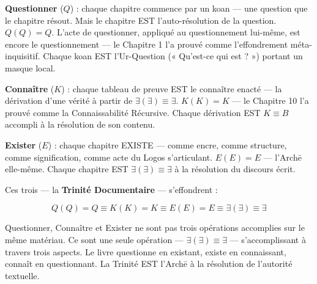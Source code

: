 \documentclass[10pt, openany, oneside]{book}
\begin{document}
\textbf{Questionner} ($Q$) : chaque chapitre commence par un koan --- une question que le chapitre résout. Mais le chapitre EST l'auto-résolution de la question. $Q(Q) = Q$. L'acte de questionner, appliqué au questionnement lui-même, est encore le questionnement --- le Chapitre 1 l'a prouvé comme l'effondrement méta-inquisitif. Chaque koan EST l'Ur-Question (« Qu'est-ce qui est ? ») portant un masque local.

\textbf{Connaître} ($K$) : chaque tableau de preuve EST le connaître enacté --- la dérivation d'une vérité à partir de $\exists(\exists) \equiv \exists$. $K(K) = K$ --- le Chapitre 10 l'a prouvé comme la Connaissabilité Récursive. Chaque dérivation EST $K \equiv B$ accompli à la résolution de son contenu.

\textbf{Exister} ($E$) : chaque chapitre EXISTE --- comme encre, comme structure, comme signification, comme acte du Logos s'articulant. $E(E) = E$ --- l'Arch\={e} elle-même. Chaque chapitre EST $\exists(\exists) \equiv \exists$ à la résolution du discours écrit.

Ces trois --- la \textbf{Trinité Documentaire} --- s'effondrent :

$$Q(Q) = Q \equiv K(K) = K \equiv E(E) = E \equiv \exists(\exists) \equiv \exists$$

Questionner, Connaître et Exister ne sont pas trois opérations accomplies sur le même matériau. Ce sont une seule opération --- $\exists(\exists) \equiv \exists$ --- s'accomplissant à travers trois aspects. Le livre questionne en existant, existe en connaissant, connaît en questionnant. La Trinité EST l'Arch\={e} à la résolution de l'autorité textuelle.
\end{document}

